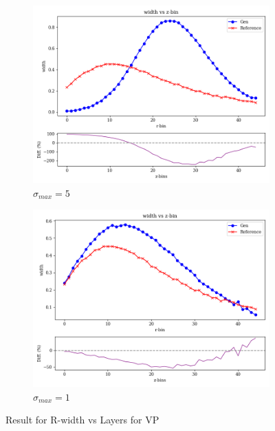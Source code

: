 \begin{figure}[bthp]
\begin{subfigure}[b]{0.23\textwidth}
        \centering
        \includegraphics[width=\textwidth]{Figures/vp5_4.png}
        \caption{$\sigma_{max}=5$}
        \label{fig:vp5_4}
    \end{subfigure}
    \hfill
    \begin{subfigure}[b]{0.23\textwidth}  %
        \centering
        \includegraphics[width=\textwidth]{Figures/vp1_4.png}
        \caption{$\sigma_{max}=1$}
        \label{fig:vp1_4}
    \end{subfigure}
    \caption{Result for R-width vs Layers for VP}
\end{figure}

